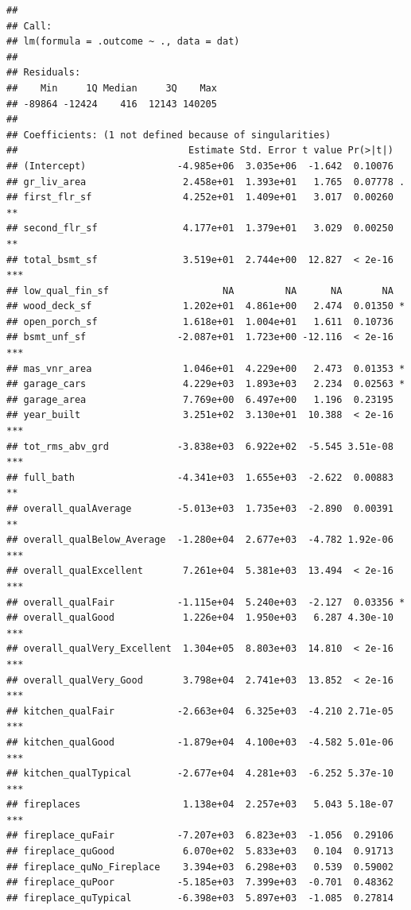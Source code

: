 \documentclass[
]{article}
\begin{document}
\begin{verbatim}
## 
## Call:
## lm(formula = .outcome ~ ., data = dat)
## 
## Residuals:
##    Min     1Q Median     3Q    Max 
## -89864 -12424    416  12143 140205 
## 
## Coefficients: (1 not defined because of singularities)
##                              Estimate Std. Error t value Pr(>|t|)    
## (Intercept)                -4.985e+06  3.035e+06  -1.642  0.10076    
## gr_liv_area                 2.458e+01  1.393e+01   1.765  0.07778 .  
## first_flr_sf                4.252e+01  1.409e+01   3.017  0.00260 ** 
## second_flr_sf               4.177e+01  1.379e+01   3.029  0.00250 ** 
## total_bsmt_sf               3.519e+01  2.744e+00  12.827  < 2e-16 ***
## low_qual_fin_sf                    NA         NA      NA       NA    
## wood_deck_sf                1.202e+01  4.861e+00   2.474  0.01350 *  
## open_porch_sf               1.618e+01  1.004e+01   1.611  0.10736    
## bsmt_unf_sf                -2.087e+01  1.723e+00 -12.116  < 2e-16 ***
## mas_vnr_area                1.046e+01  4.229e+00   2.473  0.01353 *  
## garage_cars                 4.229e+03  1.893e+03   2.234  0.02563 *  
## garage_area                 7.769e+00  6.497e+00   1.196  0.23195    
## year_built                  3.251e+02  3.130e+01  10.388  < 2e-16 ***
## tot_rms_abv_grd            -3.838e+03  6.922e+02  -5.545 3.51e-08 ***
## full_bath                  -4.341e+03  1.655e+03  -2.622  0.00883 ** 
## overall_qualAverage        -5.013e+03  1.735e+03  -2.890  0.00391 ** 
## overall_qualBelow_Average  -1.280e+04  2.677e+03  -4.782 1.92e-06 ***
## overall_qualExcellent       7.261e+04  5.381e+03  13.494  < 2e-16 ***
## overall_qualFair           -1.115e+04  5.240e+03  -2.127  0.03356 *  
## overall_qualGood            1.226e+04  1.950e+03   6.287 4.30e-10 ***
## overall_qualVery_Excellent  1.304e+05  8.803e+03  14.810  < 2e-16 ***
## overall_qualVery_Good       3.798e+04  2.741e+03  13.852  < 2e-16 ***
## kitchen_qualFair           -2.663e+04  6.325e+03  -4.210 2.71e-05 ***
## kitchen_qualGood           -1.879e+04  4.100e+03  -4.582 5.01e-06 ***
## kitchen_qualTypical        -2.677e+04  4.281e+03  -6.252 5.37e-10 ***
## fireplaces                  1.138e+04  2.257e+03   5.043 5.18e-07 ***
## fireplace_quFair           -7.207e+03  6.823e+03  -1.056  0.29106    
## fireplace_quGood            6.070e+02  5.833e+03   0.104  0.91713    
## fireplace_quNo_Fireplace    3.394e+03  6.298e+03   0.539  0.59002    
## fireplace_quPoor           -5.185e+03  7.399e+03  -0.701  0.48362    
## fireplace_quTypical        -6.398e+03  5.897e+03  -1.085  0.27814    

\end{verbatim}
\end{document}
